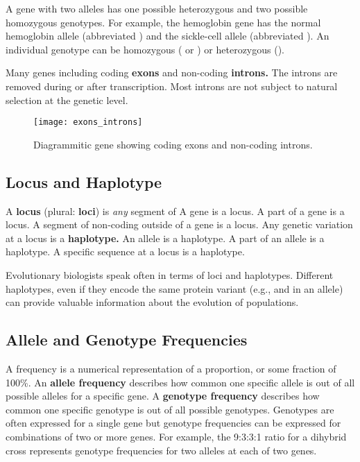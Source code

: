 \documentclass[letterpaper]{tufte-handout}
\begin{document}
A gene with two alleles has one possible heterozygous and two possible homozygous genotypes.  For example, the hemoglobin gene has the normal hemoglobin allele (abbreviated ) and the sickle-cell allele (abbreviated ). An individual genotype can be homozygous ( or ) or heterozygous ().

Many genes including coding \textbf{exons} and non-coding \textbf{introns.} The introns are removed during or after transcription. Most introns are not subject to natural selection at the genetic level.

\begin{figure}
\texttt{[image: exons\_introns]}
\caption{Diagrammitic gene showing coding exons and non-coding introns.}
\end{figure}


\subsection*{Locus and Haplotype}

A \textbf{locus} (plural: \textbf{loci}) is \emph{any} segment of  A gene is a locus. A part of a gene is a locus. A segment of non-coding  outside of a gene is a locus. Any genetic variation at a locus is a \textbf{haplotype.} An allele is a haplotype. A part of an allele is a haplotype. A specific  sequence at a locus is a haplotype. 

Evolutionary biologists speak often in terms of loci and haplotypes. Different haplotypes, even if they encode the same protein variant (e.g.,  and  in an allele) can provide valuable information about the evolution of populations.

\subsection*{Allele and Genotype Frequencies}

A frequency is a numerical representation of a proportion, or some fraction of 100\%. An \textbf{allele frequency} describes how common one specific allele is out of all possible alleles for a specific gene. A \textbf{genotype frequency} describes how common one specific genotype is out of all possible genotypes. Genotypes are often expressed for a single gene but genotype frequencies can be expressed for combinations of two or more genes.  For example, the 9:3:3:1 ratio for a dihybrid cross represents genotype frequencies for two alleles at each of two genes. 
\end{document}

